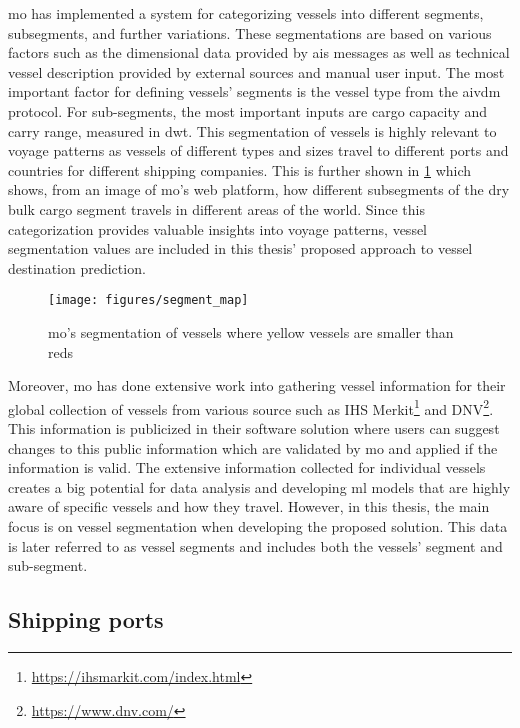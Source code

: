 \acrshort{mo} has implemented a system for categorizing vessels into different segments, subsegments, and further variations. These segmentations are based on various factors such as the dimensional data provided by \acrshort{ais} messages as well as technical vessel description provided by external sources and manual user input. The most important factor for defining vessels' segments is the vessel type from the \gls{aivdm} protocol. For sub-segments, the most important inputs are cargo capacity and carry range, measured in \acrshort{dwt}. This segmentation of vessels is highly relevant to voyage patterns as vessels of different types and sizes travel to different ports and countries for different shipping companies. This is further shown in \cref{fig:segment_map} which shows, from an image of \acrshort{mo}'s web platform, how different subsegments of the dry bulk cargo segment travels in different areas of the world. Since this categorization provides valuable insights into voyage patterns, vessel segmentation values are included in this thesis' proposed approach to vessel destination prediction.

\begin{figure}[htbp]
    \centering
    \texttt{[image: figures/segment\_map]}
    \caption{\acrfull{mo}’s segmentation of vessels where yellow vessels are smaller than reds}
    \label{fig:segment_map}
\end{figure}

Moreover, \acrshort{mo} has done extensive work into gathering vessel information for their global collection of vessels from various source such as IHS Merkit\footnote{\url{https://ihsmarkit.com/index.html}} and DNV\footnote{\url{https://www.dnv.com/}}. This information is publicized in their software solution where users can suggest changes to this public information which are validated by \acrshort{mo} and applied if the information is valid. The extensive information collected for individual vessels creates a big potential for data analysis and developing \acrshort{ml} models that are highly aware of specific vessels and how they travel. However, in this thesis, the main focus is on vessel segmentation when developing the proposed solution. This data is later referred to as vessel segments and includes both the vessels' segment and sub-segment.

\subsection{Shipping ports}
\label{sec:shipping_ports}

